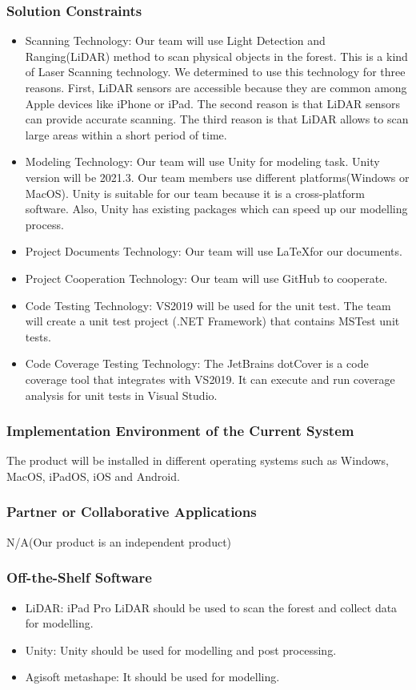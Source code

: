\documentclass{article}
\begin{document}
\subsubsection{Solution Constraints}
\begin{itemize}
    \item Scanning Technology: Our team will use Light Detection and Ranging(LiDAR) method
    to scan physical objects in the forest. This is a kind of Laser Scanning technology. 
    We determined to use this technology for three reasons. First, LiDAR sensors
    are accessible because they are common among Apple devices like iPhone or iPad. The 
    second reason is that LiDAR sensors can provide accurate scanning. The third reason
    is that LiDAR allows to scan large areas within a short period of time.
    \item Modeling Technology: Our team will use Unity for modeling task. Unity version 
    will be 2021.3. Our team members use different platforms(Windows or MacOS). Unity is 
    suitable for our team because it is a cross-platform software. Also, Unity has existing packages which can speed up our modelling process.
    \item Project Documents Technology: Our team will use \LaTeX for our documents.
    \item Project Cooperation Technology: Our team will use GitHub to cooperate.
    \item Code Testing Technology: VS2019 will be used for the unit test. The team will create a unit test project (.NET Framework) that contains MSTest unit tests.
    \item Code Coverage Testing Technology: The JetBrains dotCover is a code coverage tool that integrates with VS2019. It can execute and run coverage analysis for unit tests in Visual Studio.
\end{itemize}
\subsubsection{Implementation Environment of the Current System}
The product will be installed in different operating systems such
as Windows, MacOS, iPadOS, iOS and Android.
\subsubsection{Partner or Collaborative Applications}
N/A(Our product is an independent product)
\subsubsection{Off-the-Shelf Software}
\begin{itemize}
    \item LiDAR: iPad Pro LiDAR should be used to scan the forest and collect data
    for modelling.
    \item Unity: Unity should be used for modelling and post processing.
    \item Agisoft metashape: It should be used for modelling.
\end{itemize}
\end{document}
